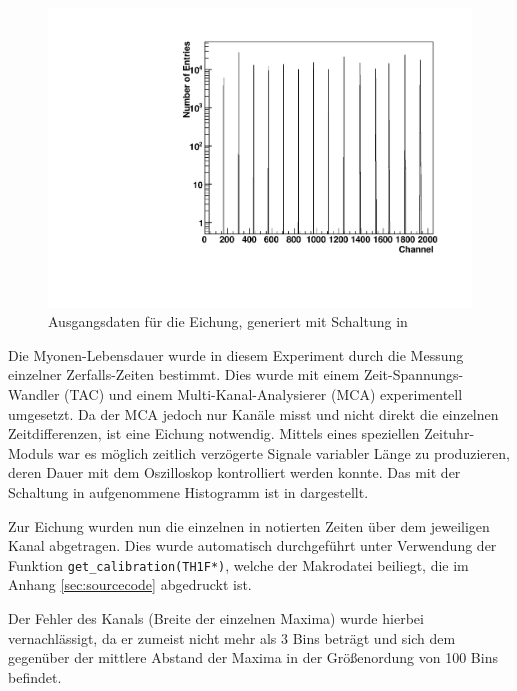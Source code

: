 \begin{figure}[ht!]
  \centering
  \includegraphics[width=\columnwidth,keepaspectratio=true]{eichung}
  \caption{Ausgangsdaten für die Eichung, generiert mit Schaltung in }
  \label{fig:eichung}
\end{figure}

Die Myonen-Lebensdauer wurde in diesem Experiment durch die Messung einzelner
Zerfalls-Zeiten bestimmt. Dies wurde mit einem Zeit-Spannungs-Wandler (TAC) und
einem Multi-Kanal-Analysierer (MCA) experimentell umgesetzt. Da der MCA jedoch
nur Kanäle misst und nicht direkt die einzelnen Zeitdifferenzen, ist eine
Eichung notwendig. Mittels eines speziellen Zeituhr-Moduls war es möglich
zeitlich verzögerte Signale variabler Länge zu produzieren, deren Dauer mit dem
Oszilloskop kontrolliert werden konnte. Das mit der Schaltung in
 aufgenommene Histogramm ist in  dargestellt.

Zur Eichung wurden nun die einzelnen in  notierten Zeiten
über dem jeweiligen Kanal abgetragen. Dies wurde automatisch durchgeführt unter
Verwendung der Funktion \texttt{get\_calibration(TH1F*)}, welche der Makrodatei
beiliegt, die im Anhang \ref{sec:sourcecode} abgedruckt ist.

Der Fehler des Kanals (Breite der einzelnen Maxima) wurde hierbei vernachlässigt,
da er zumeist nicht mehr als 3 Bins beträgt und sich dem gegenüber der mittlere
Abstand der Maxima in der Größenordung von 100 Bins befindet.

